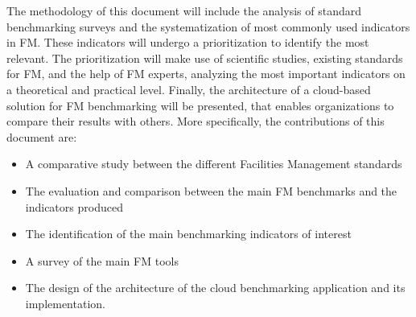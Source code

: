 The methodology of this document will include the analysis of standard benchmarking surveys and the systematization of most commonly used indicators in FM. These indicators will undergo a prioritization to identify the most relevant. The prioritization will make use of scientific studies, existing standards for FM, and the help of FM experts, analyzing the most important indicators on a theoretical and practical level. Finally, the architecture of a cloud-based solution for FM benchmarking will be presented, that enables organizations to compare their results with others. More specifically, the contributions of this document are:
\begin{itemize}
	\item A comparative study between the different Facilities Management standards
	\item The evaluation and comparison between the main FM benchmarks and the indicators produced
	\item The identification of the main benchmarking indicators of interest
	\item A survey of the main FM tools
	\item The design of the architecture of the cloud benchmarking application and its implementation.
\end{itemize}

